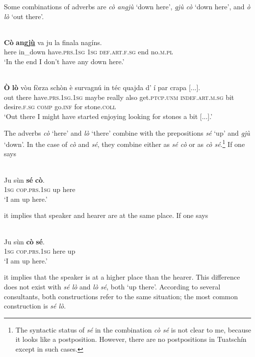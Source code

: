 Some combinations of adverbs are \textit{cò angjù} `down here', \textit{gjù cò} `down here', and \textit{ò lò} `out there'.

\ea
\label{}
\\
\gll  \textbf{Cò} \textbf{angj\underline{ù}} va ju la finala nagíns.\\
here in\_down have.\textsc{prs.1sg} \textsc{1sg} \textsc{def.art.f.sg} end no.\textsc{m.pl}  \\
\glt `In the end I don’t have any down here.'
\z

\ea
\label{}
\\
\gll  \textbf{Ò} \textbf{lò} vòu fòrza schòn è survagnú in téc quajda d' í par crapa [...].\\
out there  have.\textsc{prs.1sg.1sg} maybe really also get.\textsc{ptcp.unm} \textsc{indef.art.m.sg} bit desire.\textsc{f.sg} \textsc{comp} go.\textsc{inf} for stone.\textsc{coll}\\
\glt `Out there I might have started enjoying looking for stones a bit [...].'
\z



The adverbs \textit{cò} `here' and \textit{lò} `there' combine with the prepositions \textit{sé} `up' and \textit{gjù} `down'. In the case of \textit{cò} and \textit{sé}, they combine either as \textit{sé cò} or as \textit{cò sé}.\footnote{The syntactic status of \textit{sé} in the combination \textit{cò sé} is not clear to me, because it looks like a postposition. However, there are no postpositions in Tuatschín except in such cases.} If one says

\ea
\label{}
\\
\gll Ju sùn \textbf{sé} \textbf{cò}.\\
\textsc{1sg} \textsc{cop.prs.1sg} up here\\
\glt `I am up here.'
\z

it implies that speaker and hearer are at the same place. If one says

\ea
\label{}
\\
\gll Ju sùn \textbf{cò} \textbf{sé}.\\
\textsc{1sg} \textsc{cop.prs.1sg} here up\\
\glt `I am up here.'
\z

it implies that the speaker is at a higher place than the hearer. This difference does not exist with \textit{sé lò} and \textit{lò sé}, both `up there'. According to several consultants, both constructions refer to the same situation; the most common construction is \textit{sé lò}.

